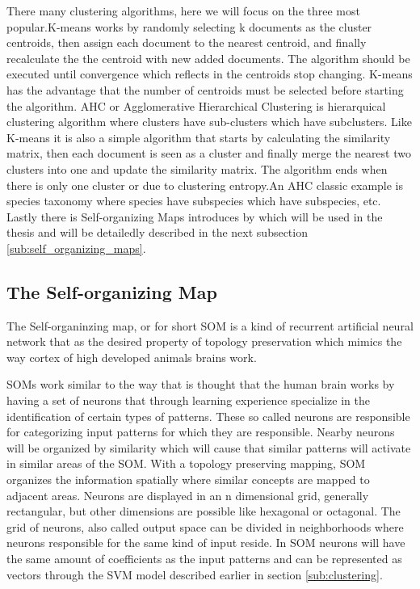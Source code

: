 There many clustering algorithms, here we will focus on the three most popular.K-means works by randomly selecting k documents as the cluster centroids, then assign each document to the nearest centroid, and finally recalculate the the centroid with new added documents. The algorithm should be executed until convergence which reflects in the centroids stop changing. K-means has the advantage that the number of centroids must be selected before starting the algorithm.
AHC or Agglomerative Hierarchical Clustering is hierarquical clustering algorithm where clusters have sub-clusters which have subclusters. Like K-means it is also a simple algorithm that starts by calculating the similarity matrix, then each document is seen as a cluster and finally merge the nearest two clusters into one and update the similarity matrix. The algorithm ends when there is only one cluster or due to clustering entropy.An AHC classic example is species taxonomy where species have subspecies which have subspecies, etc.
Lastly there is Self-organizing Maps introduces by \citep{Kohonen1990} which will be used in the thesis and will be detailedly described in the next subsection \ref{sub:self_organizing_maps}.



\subsection{The Self-organizing Map} %
\label{sub:the_self_organizing_map}

The Self-organinzing map, or for short SOM is a kind of recurrent artificial neural network that as the desired property of topology preservation which mimics the way cortex of high developed animals brains work.

SOMs work similar to the way that is thought that the human brain works by having a set of neurons that through learning experience specialize in the identification of certain types of patterns. These so called neurons are responsible for categorizing input patterns for which they are responsible. Nearby neurons will be organized by similarity which will cause that similar patterns will activate in similar areas of the SOM.
With a topology preserving mapping, SOM organizes the information spatially where similar concepts are mapped to adjacent areas.
Neurons are displayed in an n dimensional grid, generally rectangular, but other dimensions are possible like hexagonal or octagonal.  The grid of neurons, also called output space can be divided in neighborhoods where neurons responsible for the same kind of input reside.
In SOM neurons will have the same amount of coefficients as the input patterns and can be represented as vectors through the SVM model described earlier in section \ref{sub:clustering}.

